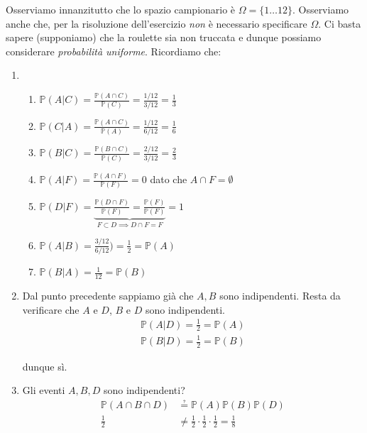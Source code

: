 \newtheorem*{oss}{Osservazione}
\newtheorem*{theorem}{Teorema}


\subsubsection{}

Osserviamo innanzitutto che lo spazio campionario è $\Omega =\{1\dotsc 12\}$. Osserviamo anche che, per la risoluzione dell'esercizio \textit{non} è necessario specificare $\Omega $. Ci basta sapere (supponiamo) che la roulette sia non truccata e dunque possiamo considerare \textit{probabilità uniforme}. Ricordiamo che:
\begin{enumerate}
\item 
\begin{enumerate}
\item $\mathbb{P}( A|C) =\frac{\mathbb{P}( A\cap C)}{\mathbb{P}( C)} =\frac{1/12}{3/12} =\frac{1}{3}$
\item $\mathbb{P}( C|A) =\frac{\mathbb{P}( A\cap C)}{\mathbb{P}( A)} =\frac{1/12}{6/12} =\frac{1}{6}$
\item $\mathbb{P}( B|C) =\frac{\mathbb{P}( B\cap C)}{\mathbb{P}( C)} =\frac{2/12}{3/12} =\frac{2}{3}$
\item $\mathbb{P}( A|F) =\frac{\mathbb{P}( A\cap F)}{\mathbb{P}( F)} =0$ dato che $A\cap F=\emptyset $
\item $\mathbb{P}( D|F) =\underbrace{\frac{\mathbb{P}( D\cap F)}{\mathbb{P}( F)} =\frac{\mathbb{P}( F)}{\mathbb{P}( F)}}_{F\subset D\implies D\cap F=F} =1$
\item $\mathbb{P}( A|B) =\frac{3/12}{6/12}) =\frac{1}{2} =\mathbb{P}( A)$
\item $\mathbb{P}( B|A) =\frac{1}{12} =\mathbb{P}( B)$
\end{enumerate}
\item Dal punto precedente sappiamo già che $A,B$ sono indipendenti. Resta da verificare che $A$ e $D$, $B$ e $D$ sono indipendenti.\begin{gather*}
\mathbb{P}( A|D) =\frac{1}{2} =\mathbb{P}( A)\\
\mathbb{P}( B|D) =\frac{1}{2} =\mathbb{P}( B)
\end{gather*}

dunque sì.
\item Gli eventi $A,B,D$ sono indipendenti?\begin{equation*}
\begin{aligned}
\mathbb{P}( A\cap B\cap D) & \questeq \mathbb{P}( A)\mathbb{P}( B)\mathbb{P}( D)\\
\frac{1}{2} & \neq \frac{1}{2} \cdotp \frac{1}{2} \cdotp \frac{1}{2} =\frac{1}{8}
\end{aligned}
\end{equation*}


\end{enumerate}
